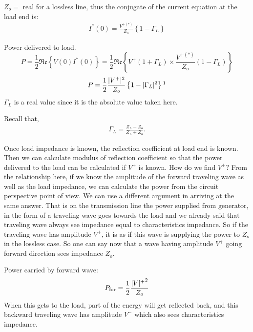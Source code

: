 $Z_o= $ real for a lossless line, thus the conjugate of the current equation at the load end is:
\begin{align*}
I^\ast (0) =\frac{V^{+ (\ast )}}{Z_o}\left\lbrace 1 -\Gamma_L \right\rbrace
\end{align*}

Power delivered to load.
\begin{dmath*}
P = \frac{1}{2}\mathfrak{Re}\left\lbrace V(0) I^\ast(0) \right\rbrace= \frac{1}{2}\mathfrak{Re}\left\lbrace V^+(1+\Gamma_L) \times\frac{V^{+(\ast)}}{Z_o} (1-\Gamma_L)\right\rbrace
\end{dmath*}
\begin{equation}
P = \frac{1}{2} \frac{|V^+|^2}{Z_o} \left\lbrace 1 -|\Gamma_L|^2 \right\rbrace\footnotemark
\end{equation}
$\Gamma_L$ is a real value since it is the absolute value taken here.

Recall that,
\begin{align*}\Gamma_L = \frac{ Z_L -Z_o }{ Z_L + Z_o }.
\end{align*}

Once load impedance is known, the reflection coefficient at load end is known. Then we can calculate modulus of reflection coefficient so that the power delivered to the load can be calculated if $V^+$ is known. How do we find $V^+ ? $ From the relationship here, if we know the amplitude of the forward traveling wave as well as the load impedance, we can calculate the power from the circuit perspective point of view. We can use a different argument in arriving at the same answer. That is on the transmission line the power supplied from generator, in the form of a traveling wave goes towards the load and we already said that traveling wave always see impedance equal to characteristics impedance. So if the traveling wave has amplitude $V^+$, it is as if this wave is supplying the power to $Z_o$ in the lossless case. So one can say now that  a wave having amplitude $V^+$ going forward direction sees impedance $Z_o$.

Power carried by forward wave:  
\begin{align*}
P_{\textnormal{for}} = \frac{1}{2} \frac{{|V|^+}^2}{Z_o}
\end{align*}
When this gets to the load, part of the energy will get reflected back, and this backward traveling wave has amplitude $V^-$ which also sees characteristics impedance.

